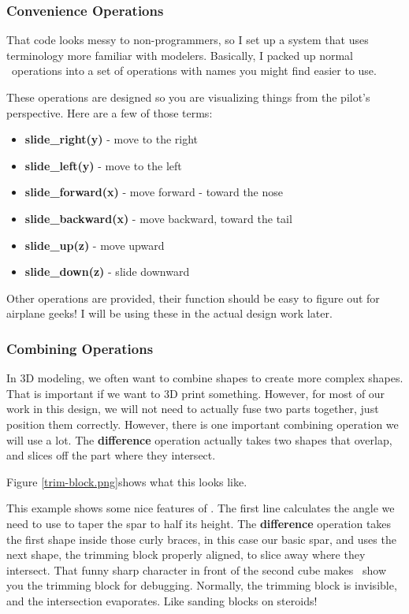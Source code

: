 \subsubsection{Convenience Operations}

That code looks messy to non-programmers, so I set up a system that uses
terminology more familiar with modelers. Basically, I packed up normal \osc\
operations into a set of operations with names you might find easier to use.

These operations are designed so you are visualizing things from the pilot's
perspective.  Here are a few of those terms:

\begin{itemize}
  \item{{\bf slide\_right(y)} - move to the right}
  \item{{\bf slide\_left(y)} - move to the left}
  \item{{\bf slide\_forward(x)} - move forward - toward the nose}
  \item{{\bf slide\_backward(x)} - move backward, toward the tail}
  \item{{\bf slide\_up(z)} - move upward}
  \item{{\bf slide\_down(z)} - slide downward}
\end{itemize}

Other operations are provided, their function should be easy to figure out for
airplane geeks! I will be using these in the actual design work later.

\subsubsection{Combining Operations}

In 3D modeling, we often want to combine shapes to create more complex shapes.
That is important if we want to 3D print something. However, for most of our
work in this design, we will not need to actually fuse two parts together, just
position them correctly. However, there is one important combining operation we
will use a lot. The {\bf difference} operation actually takes two shapes that
overlap, and slices off the part where they intersect.


Figure \ref{trim-block.png}shows what this looks like.



This example shows some nice features of \osc. The first line calculates the
angle we need to use to taper  the spar to half its height. The {\bf
difference} operation takes the first shape inside those curly braces, in this
case our basic spar, and uses the next shape, the trimming block properly
aligned, to slice away where they intersect. That funny sharp character in front
of the second cube makes \osc\ show you the trimming block for debugging.
Normally, the trimming block is invisible, and the intersection evaporates.
Like sanding blocks on steroids!

